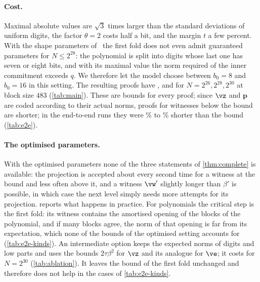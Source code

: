 \paragraph{Cost.}
Maximal absolute values are $\sqrt3$ times larger than the standard deviations of uniform digits, the factor $\theta=2$ costs half a bit, and the margin $t$ a few percent. With the shape parameters of~\cite[Table~4]{NS24} the first fold does not even admit guaranteed parameters for $N\le2^{28}$: the polynomial is split into digits whose last one has seven or eight bits, and with its maximal value the norm required of the inner commitment exceeds $q$. We therefore let the model choose between $b_0=8$ and $b_0=16$ in this setting. The resulting proofs have \nGQa, \nGQb{} and \nGQc\KB{} for $N=2^{26},2^{28},2^{30}$ at block size $483$ (\cref{tab:main}). These are bounds for every proof; since $\vz$ and $\mathbf p$ are coded according to their actual norms, proofs for witnesses below the bound are shorter; in the end-to-end runs they were \nEeGcBelowLo\% to \nEeGcBelowHi\% shorter than the bound (\cref{tab:e2e}).

\paragraph{The optimised parameters.}
With the optimised parameters none of the three statements of \cref{thm:complete} is available: the projection is accepted about every second time for a witness at the bound and less often above it, and a witness $\vw'$ slightly longer than $\beta'$ is possible, in which case the next level simply needs more attempts for its projection.  reports what happens in practice. For polynomials the critical step is the first fold: its witness contains the amortised opening of the blocks of the polynomial, and if many blocks agree, the norm of that opening is far from its expectation, which none of the bounds of the optimised setting accounts for (\cref{tab:e2e-kinds}). An intermediate option keeps the expected norms of digits and low parts and uses the bounds $2\tau\beta^2$ for $\vz$ and its analogue for $\ve$; it costs \nAblP\KB{} for $N=2^{30}$ (\cref{tab:ablation}). It leaves the bound of the first fold unchanged and therefore does not help in the cases of \cref{tab:e2e-kinds}.
